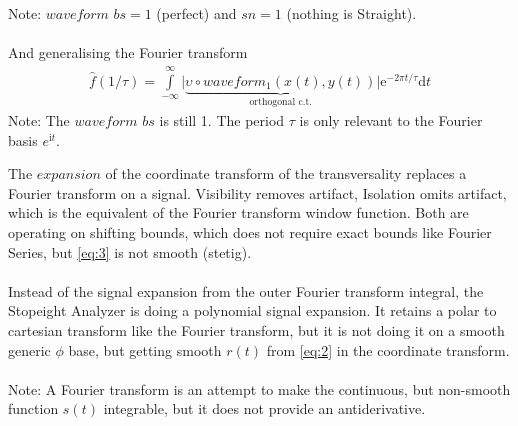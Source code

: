 \documentclass{report}
\begin{document}
Note: $waveform$ $bs=1$ (perfect) and $sn=1$ (nothing is Straight).\\\\
And generalising the Fourier transform
\begin{align}
\hat{f}(1/\tau) = \int \limits _{-\infty}^{\infty} \lvert \underbrace{\upsilon \circ waveform_{1}(x(t),y(t))}_{\text{orthogonal c.t.}} \rvert \mathrm{e}^{-2\pi t/\tau}\mathrm{d}t
\end{align}
Note: The $waveform$ $bs$ is still 1. The period $\tau$ is only relevant to the Fourier basis $e^{\mathrm{i}t}$.

The $expansion$ of the coordinate transform of the transversality replaces a Fourier transform on a signal. Visibility removes artifact, Isolation omits artifact, which is the equivalent of the Fourier transform window function. Both are operating on shifting bounds, which does not require exact bounds like Fourier Series, but \eqref{eq:3} is not smooth (stetig).\\\\
Instead of the signal expansion from the outer Fourier transform integral, the Stopeight Analyzer is doing a polynomial signal expansion. It retains a polar to cartesian transform like the Fourier transform, but it is not doing it on a smooth generic $\phi$ base, but getting smooth $r(t)$ from \eqref{eq:2} in the coordinate transform.\\\\
Note: A Fourier transform is an attempt to make the continuous, but non-smooth function $s(t)$ integrable, but it does not provide an antiderivative.
\end{document}
